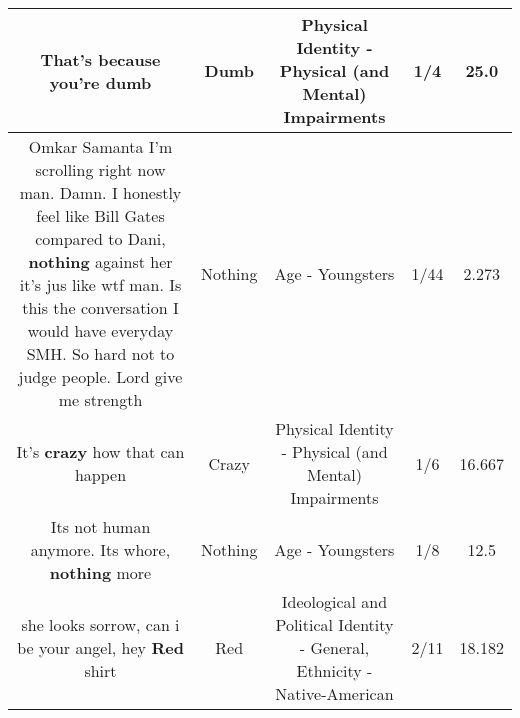 \documentclass[11pt]{article}
\newlength\mylength
\begin{document}
\begin{center}
\begin{longtable}{|C{.65\mylength}|C{.30\mylength}|C{.12\mylength}|C{.12\mylength}|C{.12\mylength}|}
  \small That's because you're dumb\normalsize   & Dumb & Physical Identity - Physical (and Mental) Impairments & 1/4 & 25.0 \\  \hline
  \small Omkar Samanta I'm scrolling right now man. Damn. I honestly feel like Bill Gates compared to Dani, \textbf{nothing} against her it's jus like wtf man. Is this the conversation I would have everyday SMH. So hard not to judge people. Lord give me strength\normalsize   & Nothing & Age - Youngsters & 1/44 & 2.273 \\  \hline
  \small It's \textbf{crazy} how that can happen\normalsize   & Crazy & Physical Identity - Physical (and Mental) Impairments & 1/6 & 16.667 \\  \hline
  \small Its not human anymore. Its whore,  \textbf{nothing} more\normalsize   & Nothing & Age - Youngsters & 1/8 & 12.5 \\  \hline
  \small she looks sorrow, can i be your angel, hey \textbf{R\textbf{ed}} shirt\normalsize   & Red &  Ideological and Political Identity - General, Ethnicity - Native-American & 2/11 & 18.182 \\  \hline

\end{longtable}
\end{center}
\end{document}
